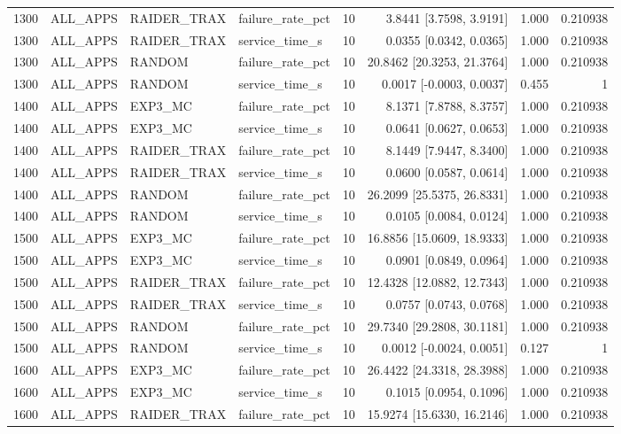 \begin{tabular}{rlllrrrr}
1300 & ALL\_APPS & RAIDER\_TRAX & failure\_rate\_pct & 10 & 3.8441 [3.7598, 3.9191] & 1.000 & 0.210938 \\
1300 & ALL\_APPS & RAIDER\_TRAX & service\_time\_s & 10 & 0.0355 [0.0342, 0.0365] & 1.000 & 0.210938 \\
1300 & ALL\_APPS & RANDOM & failure\_rate\_pct & 10 & 20.8462 [20.3253, 21.3764] & 1.000 & 0.210938 \\
1300 & ALL\_APPS & RANDOM & service\_time\_s & 10 & 0.0017 [-0.0003, 0.0037] & 0.455 & 1 \\
1400 & ALL\_APPS & EXP3\_MC & failure\_rate\_pct & 10 & 8.1371 [7.8788, 8.3757] & 1.000 & 0.210938 \\
1400 & ALL\_APPS & EXP3\_MC & service\_time\_s & 10 & 0.0641 [0.0627, 0.0653] & 1.000 & 0.210938 \\
1400 & ALL\_APPS & RAIDER\_TRAX & failure\_rate\_pct & 10 & 8.1449 [7.9447, 8.3400] & 1.000 & 0.210938 \\
1400 & ALL\_APPS & RAIDER\_TRAX & service\_time\_s & 10 & 0.0600 [0.0587, 0.0614] & 1.000 & 0.210938 \\
1400 & ALL\_APPS & RANDOM & failure\_rate\_pct & 10 & 26.2099 [25.5375, 26.8331] & 1.000 & 0.210938 \\
1400 & ALL\_APPS & RANDOM & service\_time\_s & 10 & 0.0105 [0.0084, 0.0124] & 1.000 & 0.210938 \\
1500 & ALL\_APPS & EXP3\_MC & failure\_rate\_pct & 10 & 16.8856 [15.0609, 18.9333] & 1.000 & 0.210938 \\
1500 & ALL\_APPS & EXP3\_MC & service\_time\_s & 10 & 0.0901 [0.0849, 0.0964] & 1.000 & 0.210938 \\
1500 & ALL\_APPS & RAIDER\_TRAX & failure\_rate\_pct & 10 & 12.4328 [12.0882, 12.7343] & 1.000 & 0.210938 \\
1500 & ALL\_APPS & RAIDER\_TRAX & service\_time\_s & 10 & 0.0757 [0.0743, 0.0768] & 1.000 & 0.210938 \\
1500 & ALL\_APPS & RANDOM & failure\_rate\_pct & 10 & 29.7340 [29.2808, 30.1181] & 1.000 & 0.210938 \\
1500 & ALL\_APPS & RANDOM & service\_time\_s & 10 & 0.0012 [-0.0024, 0.0051] & 0.127 & 1 \\
1600 & ALL\_APPS & EXP3\_MC & failure\_rate\_pct & 10 & 26.4422 [24.3318, 28.3988] & 1.000 & 0.210938 \\
1600 & ALL\_APPS & EXP3\_MC & service\_time\_s & 10 & 0.1015 [0.0954, 0.1096] & 1.000 & 0.210938 \\
1600 & ALL\_APPS & RAIDER\_TRAX & failure\_rate\_pct & 10 & 15.9274 [15.6330, 16.2146] & 1.000 & 0.210938 \\

\end{tabular}
